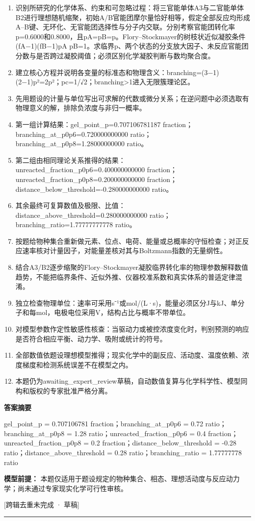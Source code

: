 \documentclass[UTF8,11pt,a4paper]{ctexart}
\begin{document}
\begin{enumerate}
\item 识别所研究的化学体系、约束和可忽略过程：将三官能单体A3与二官能单体B2进行理想随机缩聚，初始A/B官能团摩尔量恰好相等，假定全部反应均形成A–B键、无环化、无官能团选择性与分子内交联。分别考察官能团转化率p=0.6000和0.8000，且pA=pB=p。Flory–Stockmayer的树枝状近似凝胶条件(fA−1)(fB−1)pA pB=1。求临界p、两个状态的分支放大因子、未反应官能团分数与是否跨过凝胶阈值；必须区别化学凝胶判断与数均聚合度。
\item 建立核心方程并说明各变量的标准态和物理含义：branching=(3−1)(2−1)p²=2p²；pc=1/√2；branching>1进入无限簇理论区。
\item 先用题设的计量与单位写出可求解的代数或微分关系；在逆问题中必须选取有物理意义的解，排除负浓度与非归一概率。
\item 第一组计算结果：gel\_point\_p=0.707106781187 fraction；branching\_at\_p0p6=0.720000000000 ratio；branching\_at\_p0p8=1.28000000000 ratio。
\item 第二组由相同理论关系推得的结果：unreacted\_fraction\_p0p6=0.400000000000 fraction；unreacted\_fraction\_p0p8=0.200000000000 fraction；distance\_below\_threshold=-0.280000000000 ratio。
\item 其余最终可复算数值及极限、比值：distance\_above\_threshold=0.280000000000 ratio；branching\_ratio=1.77777777778 ratio。
\item 按题给物种集合重新做元素、位点、电荷、能量或总概率的守恒检查；对正反应速率核对计量因子，对能量差核对其与Boltzmann指数的无量纲性。
\item 结合A3/B2逐步缩聚的Flory–Stockmayer凝胶临界转化率的物理参数解释数值趋势，不能把临界条件、近似外推、仪器校准系数和真实体系的普适定律混淆。
\item 独立检查物理单位：速率可采用s⁻¹或mol/(L·s)，能量必须区分J与kJ、单分子和每mol，电极电位采用V，结构占比与概率不带单位。
\item 对模型参数作定性敏感性核查：当驱动力或被控浓度变化时，判别预测的响应是否符合相应平衡、动力学、吸附或统计的符号。
\item 全部数值依题设理想模型推得；现实化学中的副反应、活动度、温度依赖、浓度梯度和检测系统误差不在模型之内。
\item 本题仍为awaiting\_expert\_review草稿，自动数值复算与化学科学性、模型同构和版权的专家批准严格分离。
\end{enumerate}
\noindent\textbf{答案摘要}\par
gel\_point\_p = 0.707106781 fraction；branching\_at\_p0p6 = 0.72 ratio；branching\_at\_p0p8 = 1.28 ratio；unreacted\_fraction\_p0p6 = 0.4 fraction；unreacted\_fraction\_p0p8 = 0.2 fraction；distance\_below\_threshold = -0.28 ratio；distance\_above\_threshold = 0.28 ratio；branching\_ratio = 1.77777778 ratio\par
\noindent\textbf{模型前提：}
本题仅适用于题设规定的物种集合、相态、理想活动度与反应动力学；尚未通过专家现实化学可行性审核。\par
\noindent\textcolor{red!65!black}{[跨辑去重未完成 · 草稿]} \par
\medskip\hrule\medskip
{}
\end{document}
